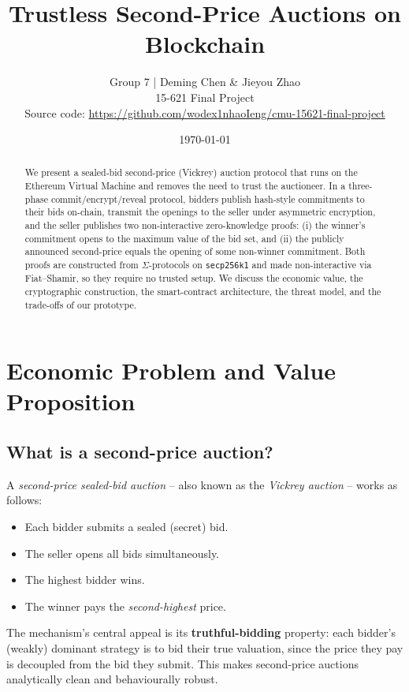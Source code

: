 \documentclass[11pt,a4paper]{article}
\title{\textbf{Trustless Second-Price Auctions on Blockchain}}
\author{Group 7 \;|\; Deming Chen \;\&\; Jieyou Zhao\\ 15-621 Final Project\\
Source code: \url{https://github.com/wodex1nhaoIeng/cmu-15621-final-project}}
\date{\today}
\begin{document}
\maketitle

\begin{abstract}
We present a sealed-bid second-price (Vickrey) auction protocol that runs on
the Ethereum Virtual Machine and removes the need to trust the auctioneer.
In a three-phase commit/encrypt/reveal protocol, bidders publish hash-style
commitments to their bids on-chain, transmit the openings to the seller under
asymmetric encryption, and the seller publishes two non-interactive
zero-knowledge proofs: (i) the winner's commitment opens to the maximum value
of the bid set, and (ii) the publicly announced second-price equals the
opening of some non-winner commitment. Both proofs are constructed from
$\Sigma$-protocols on \texttt{secp256k1} and made non-interactive via
Fiat--Shamir, so they require no trusted setup. We discuss the economic value,
the cryptographic construction, the smart-contract architecture, the threat
model, and the trade-offs of our prototype.
\end{abstract}

\section{Economic Problem and Value Proposition}

\subsection{What is a second-price auction?}

A \emph{second-price sealed-bid auction} -- also known as the
\emph{Vickrey auction} -- works as follows:

\begin{itemize}[leftmargin=*,nosep]
\item Each bidder submits a sealed (secret) bid.
\item The seller opens all bids simultaneously.
\item The highest bidder wins.
\item The winner pays the \emph{second-highest} price.
\end{itemize}

The mechanism's central appeal is its \textbf{truthful-bidding} property:
each bidder's (weakly) dominant strategy is to bid their true valuation, since
the price they pay is decoupled from the bid they submit. This makes
second-price auctions analytically clean and behaviourally robust.
\end{document}
